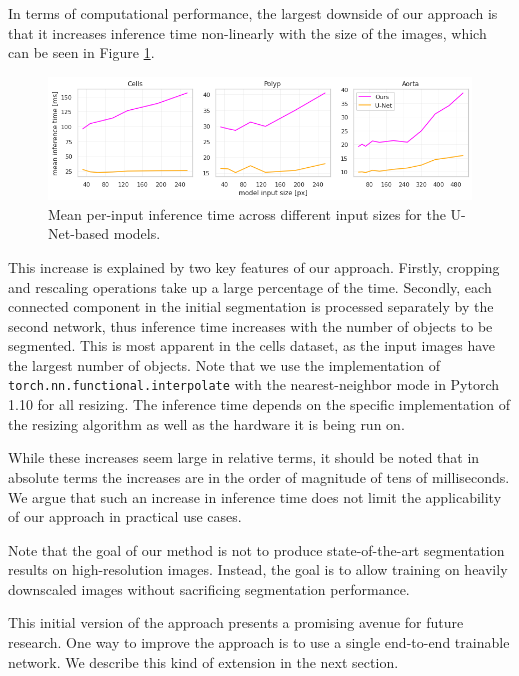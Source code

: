 In terms of computational performance, the largest downside of our approach is that it increases inference time non-linearly with the size of the images, which can be seen in Figure \ref{fig:inf-time}.

\begin{figure}[H]
\centering
\includegraphics[width=\textwidth]{images/5/inf_time.png}
\caption{Mean per-input inference time across different input sizes for the U-Net-based models. \cite{bencevicSegmentthenSegmentContextPreservingCropBased2023a}\label{fig:inf-time}}
\end{figure}

This increase is explained by two key features of our approach. Firstly, cropping and rescaling operations take up a large percentage of the time. Secondly, each connected component in the initial segmentation is processed separately by the second network, thus inference time increases with the number of objects to be segmented. This is most apparent in the cells dataset, as the input images have the largest number of objects. Note that we use the implementation of \verb|torch.nn.functional.interpolate| with the nearest-neighbor mode in Pytorch 1.10 for all resizing. The inference time depends on the specific implementation of the resizing algorithm as well as the hardware it is being run on.

While these increases seem large in relative terms, it should be noted that in absolute terms the increases are in the order of magnitude of tens of milliseconds. We argue that such an increase in inference time does not limit the applicability of our approach in practical use cases.

Note that the goal of our method is not to produce state-of-the-art segmentation results on high-resolution images. Instead, the goal is to allow training on heavily downscaled images without sacrificing segmentation performance.

This initial version of the approach presents a promising avenue for future research. One way to improve the approach is to use a single end-to-end trainable network. We describe this kind of extension in the next section.


